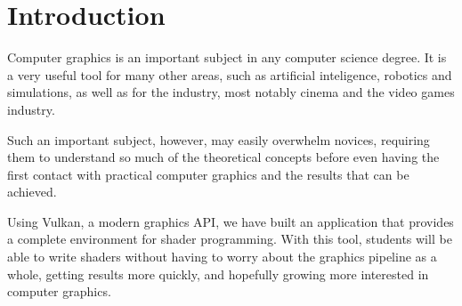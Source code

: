 \section{Introduction}
Computer graphics is an important subject in any computer science degree. It is a very useful tool for many other areas, such as artificial inteligence, robotics and simulations, as well as for the industry, most notably cinema and the video games industry.

Such an important subject, however, may easily overwhelm novices, requiring them to understand so much of the theoretical concepts before even having the first contact with practical computer graphics and the results that can be achieved.

Using Vulkan, a modern graphics API, we have built an application that provides a complete environment for shader programming. With this tool, students will be able to write shaders without having to worry about the graphics pipeline as a whole, getting results more quickly, and hopefully growing more interested in computer graphics.


